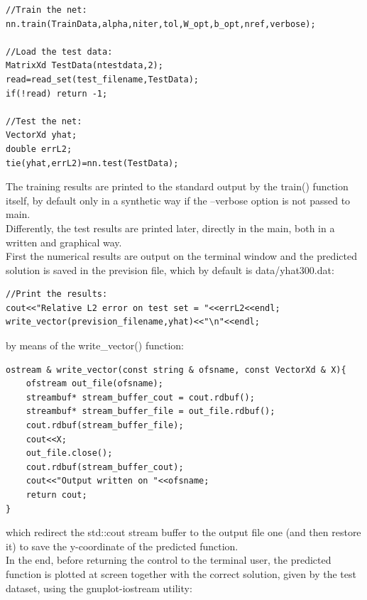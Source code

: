 \documentclass[12pt, a4paper]{report}
\theoremstyle{definition}
\begin{document}
{\begin{lstlisting}[frame=single]
//Train the net:
nn.train(TrainData,alpha,niter,tol,W_opt,b_opt,nref,verbose);

//Load the test data:
MatrixXd TestData(ntestdata,2);
read=read_set(test_filename,TestData);
if(!read) return -1;

//Test the net:
VectorXd yhat;
double errL2;
tie(yhat,errL2)=nn.test(TestData);
\end{lstlisting}
The training results are printed to the standard output by the {\ttfamily train()} function itself, by default only in a synthetic way if the {\ttfamily --verbose} option is not passed to main. \\
Differently, the test results are printed later, directly in the main, both in a written and graphical way. \\
First the numerical results are output on the terminal window and the predicted solution is saved in the prevision file, which by default is data/yhat300.dat:
\begin{lstlisting}[frame=single, showstringspaces=false]
//Print the results:
cout<<"Relative L2 error on test set = "<<errL2<<endl;
write_vector(prevision_filename,yhat)<<"\n"<<endl;
\end{lstlisting}
by means of the {\ttfamily write\_vector()} function:
\begin{lstlisting}[frame=single, showstringspaces=false]
ostream & write_vector(const string & ofsname, const VectorXd & X){
	ofstream out_file(ofsname);
	streambuf* stream_buffer_cout = cout.rdbuf();
	streambuf* stream_buffer_file = out_file.rdbuf();
	cout.rdbuf(stream_buffer_file);
	cout<<X;
	out_file.close();
	cout.rdbuf(stream_buffer_cout);
	cout<<"Output written on "<<ofsname;
	return cout;
} 
\end{lstlisting}
which redirect the {\ttfamily std::cout} stream buffer to the output file one (and then restore it) to save the y-coordinate of the predicted function.\\ 
In the end, before returning the control to the terminal user, the predicted function is plotted at screen together with the correct solution, given by the test dataset, using the gnuplot-iostream utility:
}
\end{document}
